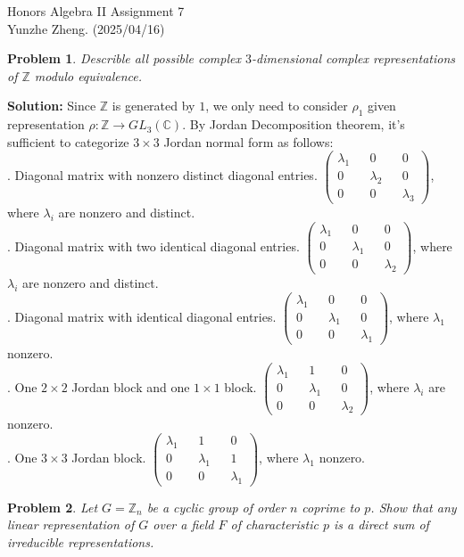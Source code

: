 \documentclass[12pt]{article}
\newtheorem{problem}{Problem}
\begin{document}
\noindent Honors Algebra II \hfill Assignment 7\\
Yunzhe Zheng. (2025/04/16)

\hrulefill

\begin{problem}
Describle all possible complex $3$-dimensional complex representations of $\mathbb{Z}$ modulo equivalence.
\end{problem}

\textbf{Solution:} Since $\mathbb{Z}$ is generated by $1$, we only need to consider $\rho_1$ given representation $\rho: \mathbb{Z}\to GL_3(\mathbb{C})$. By Jordan Decomposition theorem, it's sufficient to categorize $3\times 3$ Jordan normal form as follows: \\
. Diagonal matrix with nonzero distinct diagonal entries. $\begin{pmatrix}
    \lambda_1 && 0 && 0 \\
    0 && \lambda_2 && 0 \\
    0 && 0 && \lambda_3
\end{pmatrix}$, where $\lambda_i$ are nonzero and distinct.\\
. Diagonal matrix with two identical diagonal entries. $\begin{pmatrix}
    \lambda_1 && 0 && 0 \\
    0 && \lambda_1 && 0 \\
    0 && 0 && \lambda_2
\end{pmatrix}$, where $\lambda_i$ are nonzero and distinct. \\
. Diagonal matrix with identical diagonal entries. $\begin{pmatrix}
    \lambda_1 && 0 && 0 \\
    0 && \lambda_1 && 0 \\
    0 && 0 && \lambda_1
\end{pmatrix}$, where $\lambda_1$ nonzero.\\
. One $2\times 2$ Jordan block and one $1\times 1$ block. $\begin{pmatrix}
    \lambda_1 && 1 && 0 \\
    0 && \lambda_1 && 0 \\
    0 && 0 && \lambda_2 
\end{pmatrix}$, where $\lambda_i$ are nonzero. \\
. One $3\times 3$ Jordan block. $\begin{pmatrix}
    \lambda_1 && 1 && 0 \\
    0 &&\lambda_1 && 1 \\
    0 && 0 && \lambda_1
\end{pmatrix}$, where $\lambda_1$ nonzero.
\\
\begin{problem}
Let $G=\mathbb{Z}_n$ be a cyclic group of order $n$ coprime to $p$. Show that any linear representation of $G$ over a field $F$ of characteristic $p$ is a direct sum of irreducible representations. 
\end{problem}
\end{document}
